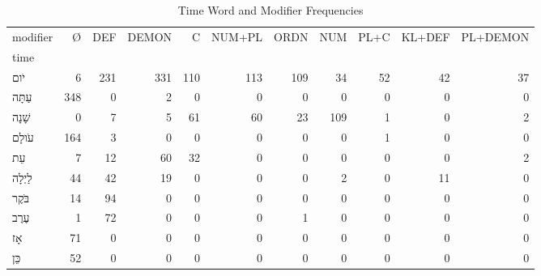 \begin{table}[htbp!]
\centering
\caption{Time Word and Modifier Frequencies}
\label{table:headpos_mod_ct}
\begin{adjustbox}{width=1\textwidth}
\begin{tabular}{lrrrrrrrrrr}
\toprule
modifier &    Ø &  DEF &  DEMON &    C &  NUM+PL &  ORDN &  NUM &  PL+C &  KL+DEF &  PL+DEMON \\
time                 &      &      &        &      &         &       &      &       &         &           \\
\midrule
\texthebrew{יֹום}    &    6 &  231 &    331 &  110 &     113 &   109 &   34 &    52 &      42 &        37 \\
\texthebrew{עַתָּה}  &  348 &    0 &      2 &    0 &       0 &     0 &    0 &     0 &       0 &         0 \\
\texthebrew{שָׁנָה}  &    0 &    7 &      5 &   61 &      60 &    23 &  109 &     1 &       0 &         2 \\
\texthebrew{עֹולָם}  &  164 &    3 &      0 &    0 &       0 &     0 &    0 &     1 &       0 &         0 \\
\texthebrew{עֵת}     &    7 &   12 &     60 &   32 &       0 &     0 &    0 &     0 &       0 &         2 \\
\texthebrew{לַיְלָה} &   44 &   42 &     19 &    0 &       0 &     0 &    2 &     0 &      11 &         0 \\
\texthebrew{בֹּקֶר}  &   14 &   94 &      0 &    0 &       0 &     0 &    0 &     0 &       0 &         0 \\
\texthebrew{עֶרֶב}   &    1 &   72 &      0 &    0 &       0 &     1 &    0 &     0 &       0 &         0 \\
\texthebrew{אָז}     &   71 &    0 &      0 &    0 &       0 &     0 &    0 &     0 &       0 &         0 \\
\texthebrew{כֵּן}    &   52 &    0 &      0 &    0 &       0 &     0 &    0 &     0 &       0 &         0 \\
\bottomrule
\end{tabular}
\end{adjustbox}
\end{table}
